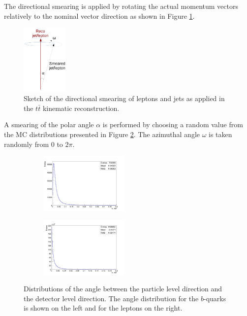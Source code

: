 The directional smearing is applied by rotating the actual momentum vectors relatively to the nominal vector direction
as shown in Figure \ref{fig:angleRot}. 
\begin{figure}[h]
 \centering
 \includegraphics[width=0.2\textwidth]{05_kinReco/plots/angle_rot.pdf}
 \caption{Sketch of the directional smearing of leptons and jets as applied in the $t\bar{t}$ kinematic reconstruction.}
 \label{fig:angleRot}
\end{figure}

A smearing of the polar angle $\alpha$ is performed by choosing a random value from
the MC distributions presented in Figure \ref{fig:dAngle}. The azimuthal angle $\omega$ is taken randomly from 0 to $2\pi$.

\begin{figure}[t]
\centering
\begin{subfigure}
  \centering
  \includegraphics[width=0.48\textwidth]{05_kinReco/plots/dan_jet.png}
\end{subfigure}
\begin{subfigure}
  \centering
  \includegraphics[width=0.48\textwidth]{05_kinReco/plots/dan_lep.png}
\end{subfigure}
\caption{Distributions of the angle between the particle level direction and the detector level direction.
The angle distribution for the $b$-quarks is shown on the left and for the leptons on the right.}
\label{fig:dAngle}
\end{figure}

